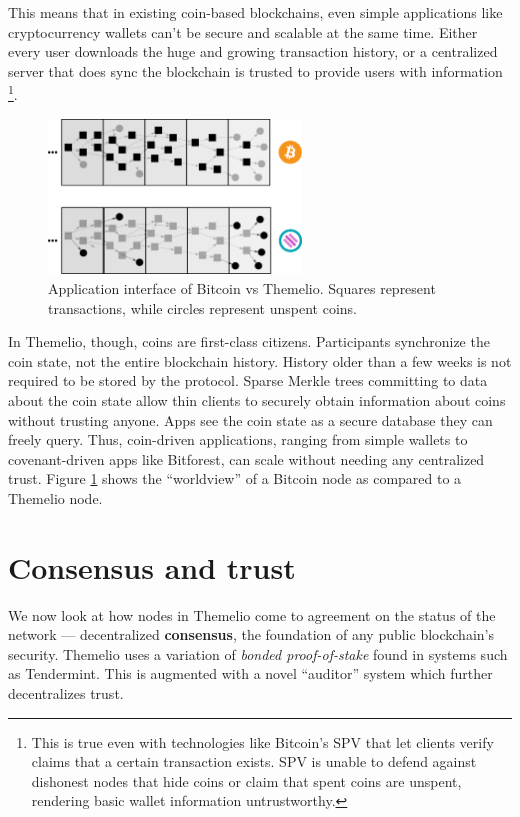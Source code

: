 \documentclass[headinclude,12pt]{scrbook}
\begin{document}
This means that in existing coin-based blockchains, even simple applications like cryptocurrency wallets can't be secure and scalable at the same time. Either every user downloads the huge and growing transaction history, or a centralized server that does sync the blockchain is trusted to provide users with information \footnote{This is true even with technologies like Bitcoin's SPV that let clients verify claims that a certain transaction exists. SPV is unable to defend against dishonest nodes that hide coins or claim that spent coins are unspent, rendering basic wallet information untrustworthy.}.

\begin{figure}
    \centering
    \includegraphics[width=0.6\textwidth]{coinint.eps}
    \caption{Application interface of Bitcoin vs Themelio. Squares represent transactions, while circles represent unspent coins.}
    \label{fig:coinint}
\end{figure}

In Themelio, though, coins are first-class citizens. Participants synchronize the coin state, not the entire blockchain history. History older than a few weeks is not required to be stored by the protocol. Sparse Merkle trees committing to data about the coin state allow thin clients to securely obtain information about coins without trusting anyone. Apps see the coin state as a secure database they can freely query. Thus, coin-driven applications, ranging from simple wallets to covenant-driven apps like Bitforest, can scale without needing any centralized trust. Figure \ref{fig:coinint} shows the ``worldview'' of a Bitcoin node as compared to a Themelio node.

\section{Consensus and trust} \label{ss:consensus}

We now look at how nodes in Themelio come to agreement on the status of the network --- decentralized \textbf{consensus}, the foundation of any public blockchain's security. Themelio uses a variation of \emph{bonded proof-of-stake} found in systems such as Tendermint. This is augmented with a novel ``auditor'' system which further decentralizes trust.
\end{document}
